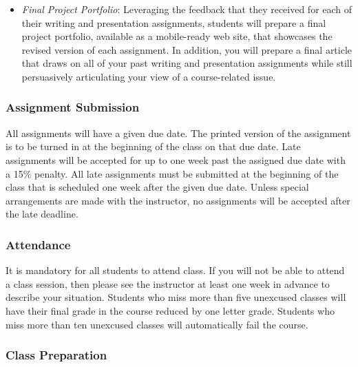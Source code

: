 \begin{itemize}
  \item {\em Final Project Portfolio}: Leveraging the feedback that they received for each of their writing and
    presentation assignments, students will prepare a final project portfolio, available as a mobile-ready web site,
    that showcases the revised version of each assignment. In addition, you will prepare a final article that draws on
    all of your past writing and presentation assignments while still persuasively articulating your view of a
    course-related issue.

\end{itemize}
\vspace*{-.1in}

\subsubsection*{Assignment Submission}

All assignments will have a given due date. The printed version of the assignment is to be turned in at the beginning
of the class on that due date. Late assignments will be accepted for up to one week past the assigned due date with a
15\% penalty. All late assignments must be submitted at the beginning of the class that is scheduled one week after the
given due date. Unless special arrangements are made with the instructor, no assignments will be accepted after the
late deadline.

\subsubsection*{Attendance}

It is mandatory for all students to attend class.  If you will not be able to attend a class session, then please see
the instructor at least one week in advance to describe your situation.  Students who miss more than five unexcused
classes will have their final grade in the course reduced by one letter grade.  Students who miss more than ten
unexcused classes will automatically fail the course.

\vspace*{-.1in}
\subsubsection*{Class Preparation}


